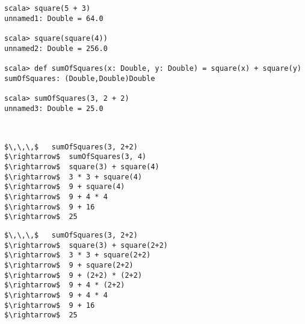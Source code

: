 \begin{itemize}
\begin{lstlisting}
scala> square(5 + 3)
unnamed1: Double = 64.0

scala> square(square(4))
unnamed2: Double = 256.0

scala> def sumOfSquares(x: Double, y: Double) = square(x) + square(y)
sumOfSquares: (Double,Double)Double

scala> sumOfSquares(3, 2 + 2)
unnamed3: Double = 25.0
\end{lstlisting}



\example\ 
 
\begin{lstlisting}
$\,\,\,$   sumOfSquares(3, 2+2)
$\rightarrow$  sumOfSquares(3, 4)
$\rightarrow$  square(3) + square(4)
$\rightarrow$  3 * 3 + square(4)
$\rightarrow$  9 + square(4)
$\rightarrow$  9 + 4 * 4
$\rightarrow$  9 + 16
$\rightarrow$  25
\end{lstlisting}

\begin{lstlisting}
$\,\,\,$   sumOfSquares(3, 2+2)
$\rightarrow$  square(3) + square(2+2)
$\rightarrow$  3 * 3 + square(2+2)
$\rightarrow$  9 + square(2+2)
$\rightarrow$  9 + (2+2) * (2+2)
$\rightarrow$  9 + 4 * (2+2)
$\rightarrow$  9 + 4 * 4
$\rightarrow$  9 + 16
$\rightarrow$  25
\end{lstlisting}



\end{itemize}

